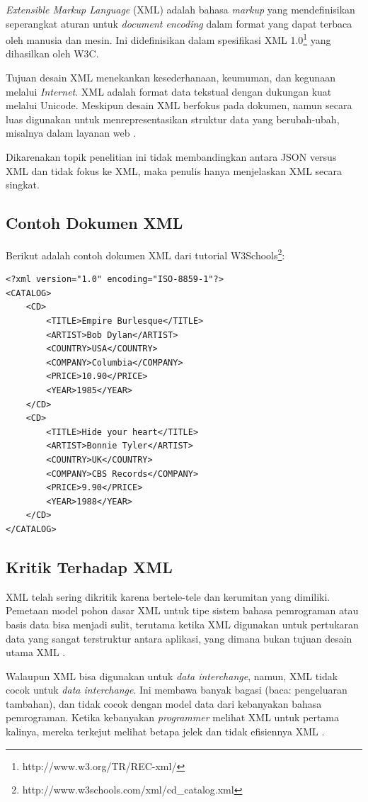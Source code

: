 \documentclass[a4paper, 12pt, oneside]{report}
\begin{document}
\onehalfspacing \textit{Extensible Markup Language} (XML) adalah bahasa \textit{markup} yang mendefinisikan seperangkat aturan untuk \textit{document encoding} dalam format yang dapat terbaca oleh manusia dan mesin. Ini didefinisikan dalam spesifikasi XML 1.0\footnote{http://www.w3.org/TR/REC-xml/} yang dihasilkan oleh W3C.

\onehalfspacing Tujuan desain XML menekankan kesederhanaan, keumuman, dan kegunaan melalui \textit{Internet}. XML adalah format data tekstual dengan dukungan kuat melalui Unicode. Meskipun desain XML berfokus pada dokumen, namun secara luas digunakan untuk menrepresentasikan struktur data yang berubah-ubah, misalnya dalam layanan web \cite{xml-wikipedia}.

\onehalfspacing Dikarenakan topik penelitian ini tidak membandingkan antara JSON versus XML dan tidak fokus ke XML, maka penulis hanya menjelaskan XML secara singkat.

\subsection{Contoh Dokumen XML}
\onehalfspacing Berikut adalah contoh dokumen XML dari tutorial W3Schools\footnote{http://www.w3schools.com/xml/cd\_catalog.xml}:

\begin{lstlisting}[frame=single]
<?xml version="1.0" encoding="ISO-8859-1"?>
<CATALOG>
	<CD>
		<TITLE>Empire Burlesque</TITLE>
		<ARTIST>Bob Dylan</ARTIST>
		<COUNTRY>USA</COUNTRY>
		<COMPANY>Columbia</COMPANY>
		<PRICE>10.90</PRICE>
		<YEAR>1985</YEAR>
	</CD>
	<CD>
		<TITLE>Hide your heart</TITLE>
		<ARTIST>Bonnie Tyler</ARTIST>
		<COUNTRY>UK</COUNTRY>
		<COMPANY>CBS Records</COMPANY>
		<PRICE>9.90</PRICE>
		<YEAR>1988</YEAR>
	</CD>
</CATALOG>
\end{lstlisting}

\subsection{Kritik Terhadap XML}

\onehalfspacing XML telah sering dikritik karena bertele-tele dan kerumitan yang dimiliki. Pemetaan model pohon dasar XML untuk tipe sistem bahasa pemrograman atau basis data bisa menjadi sulit, terutama ketika XML digunakan untuk pertukaran data yang sangat terstruktur antara aplikasi, yang dimana bukan tujuan desain utama XML \cite{xml-wikipedia}.

\onehalfspacing Walaupun XML bisa digunakan untuk \textit{data interchange}, namun, XML tidak cocok untuk \textit{data interchange}. Ini membawa banyak bagasi (baca: pengeluaran tambahan), dan tidak cocok dengan model data dari kebanyakan bahasa pemrograman. Ketika kebanyakan \textit{programmer} melihat XML untuk pertama kalinya, mereka terkejut melihat betapa jelek dan tidak efisiennya XML \cite{json-fat-free}.
\end{document}
